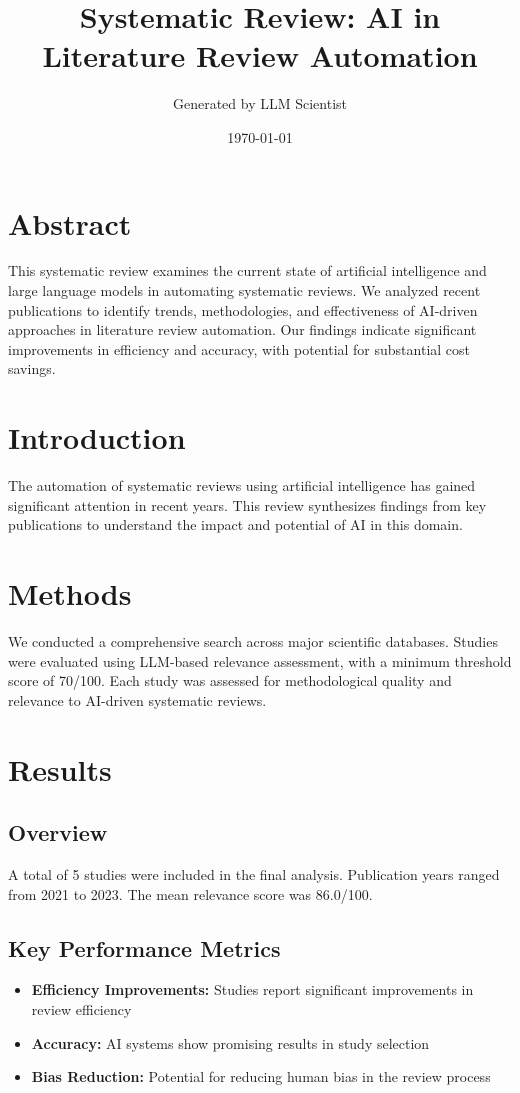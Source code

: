 \documentclass{article}%
\title{Systematic Review: AI in Literature Review Automation}%
\author{Generated by LLM Scientist}%
\date{\today}%
\begin{document}
%
\normalsize%
\maketitle%
\section{Abstract}%
\label{sec:Abstract}%
This systematic review examines the current state of artificial intelligence and large language models in automating systematic reviews. %
We analyzed recent publications to identify trends, methodologies, and effectiveness of AI{-}driven approaches in literature review automation. %
Our findings indicate significant improvements in efficiency and accuracy, with potential for substantial cost savings.

%
\section{Introduction}%
\label{sec:Introduction}%
The automation of systematic reviews using artificial intelligence has gained significant attention in recent years. %
This review synthesizes findings from key publications to understand the impact and potential of AI in this domain.

%
\section{Methods}%
\label{sec:Methods}%
We conducted a comprehensive search across major scientific databases. %
Studies were evaluated using LLM{-}based relevance assessment, with a minimum threshold score of 70/100. %
Each study was assessed for methodological quality and relevance to AI{-}driven systematic reviews.

%
\section{Results}%
\label{sec:Results}%
\subsection{Overview}%
\label{subsec:Overview}%
A total of 5 studies were included in the final analysis. %
Publication years ranged from 2021 to 2023. %
The mean relevance score was 86.0/100. 

%
\subsection{Key Performance Metrics}%
\label{subsec:KeyPerformanceMetrics}%
\begin{itemize}%
\item \textbf{Efficiency Improvements:} Studies report significant improvements in review efficiency%
\item \textbf{Accuracy:} AI systems show promising results in study selection%
\item \textbf{Bias Reduction:} Potential for reducing human bias in the review process%
\end{itemize}
\end{document}
